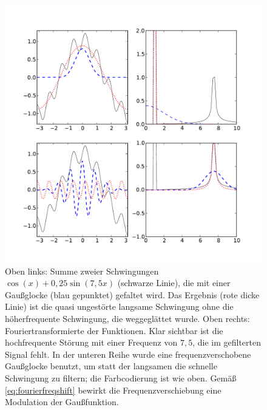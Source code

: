 \begin{figure}
  \centering
  \includegraphics[width=\textwidth]{plots/fouriertrafo}
  \caption{Oben links: Summe zweier Schwingungen $\cos(x) +
    0,25\sin(7,5 x)$ (schwarze Linie), die mit einer Gaußglocke (blau
    gepunktet) gefaltet wird. Das Ergebnis (rote dicke Linie) ist die
    quasi ungestörte langsame Schwingung ohne die höherfrequente
    Schwingung, die weggeglättet wurde. Oben rechts:
    Fouriertransformierte der Funktionen. Klar sichtbar ist die
    hochfrequente Störung mit einer Frequenz von $7,5$, die im
    gefilterten Signal fehlt. In der unteren Reihe wurde eine
    frequenzverschobene Gaußglocke benutzt, um statt der langsamen die
    schnelle Schwingung zu filtern; die Farbcodierung ist wie
    oben. Gemäß \eqref{eq:fourierfreqshift} bewirkt die
    Frequenzverschiebung eine Modulation der Gaußfunktion.}
  \label{fig:fourierfaltung}
\end{figure}


